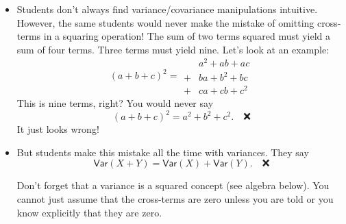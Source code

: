 \documentclass[
  letterpaper,
  DIV=11,
  numbers=noendperiod]{scrartcl}
\begin{document}
\begin{tcolorbox}[enhanced jigsaw, arc=.35mm, bottomrule=.15mm, bottomtitle=1mm, breakable, colback=white, colbacktitle=quarto-callout-note-color!10!white, colframe=quarto-callout-note-color-frame, coltitle=black, left=2mm, leftrule=.75mm, opacityback=0, opacitybacktitle=0.6, rightrule=.15mm, title=\textcolor{quarto-callout-note-color}{\faInfo}\hspace{0.5em}{Intuition}, titlerule=0mm, toprule=.15mm, toptitle=1mm]

\begin{itemize}
\item
  Students don't always find variance/covariance manipulations
  intuitive. However, the same students would never make the mistake of
  omitting cross-terms in a squaring operation! The sum of two terms
  squared must yield a sum of four terms. Three terms must yield nine.
  Let's look at an example:
  \[(a + b + c)^2 = \begin{aligned}&a^2 + ab + ac \\ + &ba + b^2 + bc \\ + &ca + cb + c^2\end{aligned}\]
  This is nine terms, right? You would never say
  \[(a+b+c)^2 = a^2 + b^2 + c^2.\quad \text{❌}\] It just looks wrong!
\item
  But students make this mistake all the time with variances. They say
  \[\mathsf{Var}(X+Y) = \mathsf{Var}(X) + \mathsf{Var}(Y).\quad \text{❌}\]

  Don't forget that a variance is a squared concept (see algebra below).
  You cannot just assume that the cross-terms are zero unless you are
  told or you know explicitly that they are zero.
\end{itemize}

\end{tcolorbox}
\end{document}
